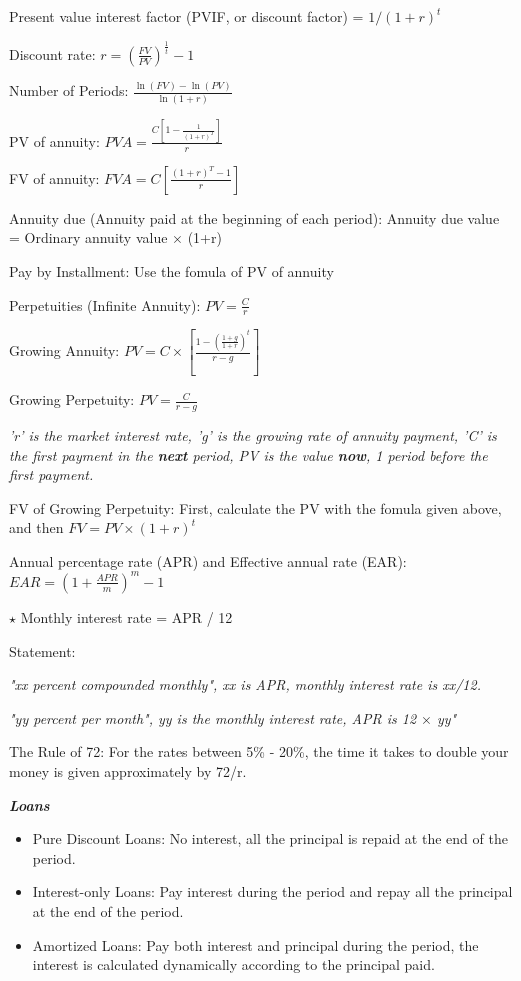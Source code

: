 \documentclass{article}
\newcommand{\properframed}[1]{
	{
		\centering
		\vspace{-2 ex}
		\begin{framed}
			\vspace{-1.5 ex}
			#1
			\vspace{-1.5 ex}
		\end{framed}
		\vspace{-2 ex}
	}
}
\newcommand{\smalltitle}[1]{
	\noindent
	\textbf{\textit{#1}}
}
\begin{document}
Present value interest factor (PVIF, or discount factor) = $1/(1+r)^{t}$

Discount rate: $r = (\frac{FV}{PV})^{\frac{1}{t}}-1$

Number of Periods: $\frac{\ln(FV)-\ln(PV)}{\ln(1+r)}$



PV of annuity: $PVA = \frac{C[1-\frac{1}{(1+r)^{T}}]}{r}$

FV of annuity: $FVA = C[\frac{(1+r)^{T}-1}{r}]$


Annuity due (Annuity paid at the beginning of each period): Annuity due value = Ordinary annuity value $\times$ (1+r)

Pay by Installment: Use the fomula of PV of annuity


Perpetuities (Infinite Annuity): $PV = \frac{C}{r}$

Growing Annuity: $PV = C\times [\frac{1-(\frac{1+g}{1+r})^{t}}{r-g}]$

Growing Perpetuity: $PV = \frac{C}{r-g}$

\properframed{

\textit{'r' is the market interest rate, 'g' is the growing rate of annuity payment, 'C' is the first payment in the \textbf{next} period, PV is the value \textbf{now}, 1 period before the first payment.}
}

FV of Growing Perpetuity: First, calculate the PV with the fomula given above, and then $FV = PV\times(1+r)^{t}$

\properframed{
Annual percentage rate (APR) and Effective annual rate (EAR):
$EAR = (1+\frac{APR}{m})^{m}-1$

$\star$ Monthly interest rate = APR / 12
}

Statement: 

\textit{"xx percent compounded monthly", xx is APR, monthly interest rate is xx/12.}

\textit{"yy percent per month", yy is the monthly interest rate, APR is 12 $\times$ yy"}

The Rule of 72: For the rates between 5\% - 20\%, the time it takes to double your money is given approximately by 72/r.


\smalltitle{Loans}

\begin{itemize}
	\item Pure Discount Loans: No interest, all the principal is repaid at the end of the period.
	\item Interest-only Loans: Pay interest during the period and repay all the principal at the end of the period.
	\item Amortized Loans: Pay both interest and principal during the period, the interest is calculated dynamically according to the principal paid.
\end{itemize}
\end{document}
